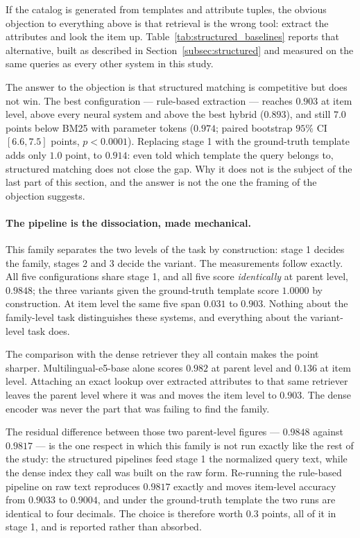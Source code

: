 \documentclass[preprint,review,12pt]{elsarticle}
\begin{document}
If the catalog is generated from templates and attribute tuples, the obvious objection to everything above is that retrieval is the wrong tool: extract the attributes and look the item up. Table~\ref{tab:structured_baselines} reports that alternative, built as described in Section~\ref{subsec:structured} and measured on the same queries as every other system in this study.



The answer to the objection is that structured matching is competitive but does not win. The best configuration --- rule-based extraction --- reaches $0.903$ at item level, above every neural system and above the best hybrid ($0.893$), and still $7.0$ points below BM25 with parameter tokens ($0.974$; paired bootstrap $95\%$ CI $[6.6, 7.5]$ points, $p < 0.0001$). Replacing stage 1 with the ground-truth template adds only $1.0$ point, to $0.914$: even told which template the query belongs to, structured matching does not close the gap. Why it does not is the subject of the last part of this section, and the answer is not the one the framing of the objection suggests.

\paragraph{The pipeline is the dissociation, made mechanical.}
This family separates the two levels of the task by construction: stage 1 decides the family, stages 2 and 3 decide the variant. The measurements follow exactly. All five configurations share stage 1, and all five score \emph{identically} at parent level, $0.9848$; the three variants given the ground-truth template score $1.0000$ by construction. At item level the same five span $0.031$ to $0.903$. Nothing about the family-level task distinguishes these systems, and everything about the variant-level task does.

The comparison with the dense retriever they all contain makes the point sharper. Multilingual-e5-base alone scores $0.982$ at parent level and $0.136$ at item level. Attaching an exact lookup over extracted attributes to that same retriever leaves the parent level where it was and moves the item level to $0.903$. The dense encoder was never the part that was failing to find the family.

The residual difference between those two parent-level figures --- $0.9848$ against $0.9817$ --- is the one respect in which this family is not run exactly like the rest of the study: the structured pipelines feed stage 1 the normalized query text, while the dense index they call was built on the raw form. Re-running the rule-based pipeline on raw text reproduces $0.9817$ exactly and moves item-level accuracy from $0.9033$ to $0.9004$, and under the ground-truth template the two runs are identical to four decimals. The choice is therefore worth $0.3$ points, all of it in stage 1, and is reported rather than absorbed.
\end{document}
